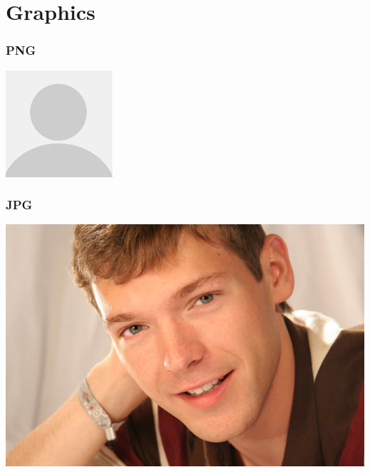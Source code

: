\documentclass{Beamer}
\begin{document}
\section{Graphics}

\begin{frame}
  \frametitle{PNG}
  \begin{center}
    \includegraphics{avatar}
  \end{center}
\end{frame}

\begin{frame}
  \frametitle{JPG}
  \begin{center}
    \includegraphics{5075}
  \end{center}
\end{frame}
\end{document}
